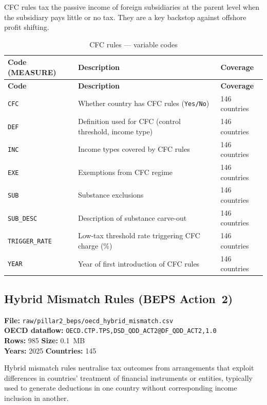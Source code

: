 \documentclass[11pt,a4paper]{article}
\begin{document}
CFC rules tax the passive income of foreign subsidiaries at the parent level when
the subsidiary pays little or no tax.  They are a key backstop against offshore
profit shifting.

\begin{longtable}{L{2.8cm} L{6.5cm} C{2.5cm}}
    \caption{CFC rules --- variable codes}
    \label{tab:cfc_rules}\\
    \toprule
    \textbf{Code (MEASURE)} & \textbf{Description} & \textbf{Coverage} \\
    \midrule
    \endfirsthead
    \toprule
    \textbf{Code} & \textbf{Description} & \textbf{Coverage} \\
    \midrule
    \endhead
    \bottomrule
    \endlastfoot
    \texttt{CFC}           & Whether country has CFC rules (\texttt{Yes/No}) & 146 countries \\
    \texttt{DEF}           & Definition used for CFC (control threshold, income type) & 146 countries \\
    \texttt{INC}           & Income types covered by CFC rules & 146 countries \\
    \texttt{EXE}           & Exemptions from CFC regime & 146 countries \\
    \texttt{SUB}           & Substance exclusions & 146 countries \\
    \texttt{SUB\_DESC}     & Description of substance carve-out & 146 countries \\
    \texttt{TRIGGER\_RATE} & Low-tax threshold rate triggering CFC charge (\%) & 146 countries \\
    \texttt{YEAR}          & Year of first introduction of CFC rules & 146 countries \\
\end{longtable}

\subsection{Hybrid Mismatch Rules (BEPS Action~2)}
\label{subsec:beps_hybrid}

\textbf{File:} \texttt{raw/pillar2\_beps/oecd\_hybrid\_mismatch.csv}\\
\textbf{OECD dataflow:} \texttt{OECD.CTP.TPS,DSD\_QDD\_ACT2@DF\_QDD\_ACT2,1.0}\\
\textbf{Rows:} 985 \quad \textbf{Size:} 0.1~MB\\
\textbf{Years:} 2025 \quad \textbf{Countries:} 145

Hybrid mismatch rules neutralise tax outcomes from arrangements that exploit
differences in countries' treatment of financial instruments or entities,
typically used to generate deductions in one country without corresponding
income inclusion in another.
\end{document}
